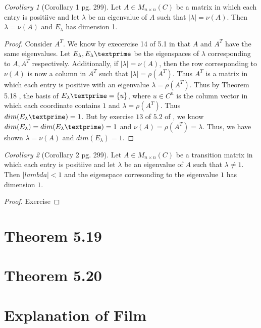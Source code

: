 \documentclass{amsart}
\theoremstyle{definition}
\theoremstyle{remark}
\newtheorem{corollary}{Corollary}[theorem]
\numberwithin{equation}{section}
\begin{document}
\begin{corollary}[Corollary 1 pg. 299]

	Let $A \in M_{n \times n}(C)$ be a matrix in which each entry is positiive and let $\lambda$ be an eigenvalue of $A$ such that $|\lambda| = \nu(A)$.
	Then  $\lambda = \nu(A)$ and $E_{\lambda}$ has dimension 1.

\end{corollary}

\begin{proof}

	Consider $A^T$.  
	We know by execercise 14 of 5.1 in \cite{friedberg2003linear} that $A$ and $A^T$ have the same eigenvalues.
	Let $E_{\lambda}, E_{\lambda}\textprime$ be the eigenspaces of $\lambda$ corresponding to $A, A^T$ respectively.
	Additionally, if $|\lambda| = \nu(A)$, then the row  corresponding to $\nu(A)$ is now a column in $A^T$ such that $|\lambda| = \rho(A^T)$.
	Thus $A^T$ is a matrix in which each entry is positive with an eigenvalue $\lambda = \rho(A^T)$.
	Thus by Theorem 5.18 \cite{friedberg2003linear}, the basis of $E_{\lambda}\textprime = \{ u \}$, where $u \in C^n$ is the column vector in which each coordinate contains $1$ and $\lambda = \rho(A^T)$.
	Thus $dim(E_{\lambda}\textprime) = 1$.
	But by exercise $13$ of $5.2$ of \cite{friedberg2003linear}, we know $dim(E_{\lambda}) = dim(E_{\lambda}\textprime) = 1$ and $\nu(A) = \rho(A^T) = \lambda$.
	Thus, we have shown $\lambda = \nu(A)$ and $dim(E_{\lambda}) = 1$.

\end{proof}



\begin{corollary}[Corollary 2 pg. 299]

	Let $A \in M_{n \times n}(C)$ be a transition matrix in which each entry is positiive and let $\lambda$ be an eigenvalue of $A$ such that $\lambda \neq 1$.
	Then  $|lambda| < 1$ and the eigenspace corresonding to the eigenvalue $1$ has dimension $1$.

\end{corollary}

\begin{proof}
	Exercise

\end{proof}

\section{Theorem 5.19}

\section{Theorem 5.20}





\section{Explanation of Film}


 
\end{document}

